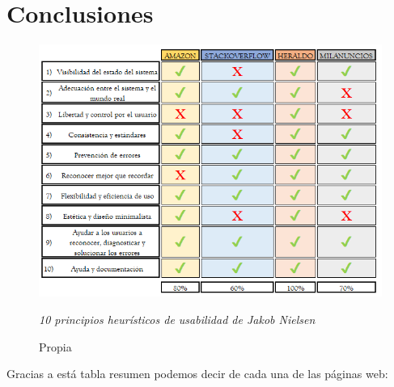 \documentclass[openany,overnay,a4paper, twoside, 14pt]{book}
\begin{document}
\chapter*{Conclusiones}
\begin{figure}[h]
\centering

\includegraphics[scale = 0.80]{tabla_resumen.png}
\renewcommand{\figurename}{Tabla resumen}
\renewcommand{\thefigure}{}
\caption{\textit{10 principios heurísticos de usabilidad de Jakob Nielsen}}
\renewcommand{\figurename}{Fuente}
\caption{Propia}
\end{figure}
Gracias a está tabla resumen podemos decir de cada una de las páginas web:
\end{document}
